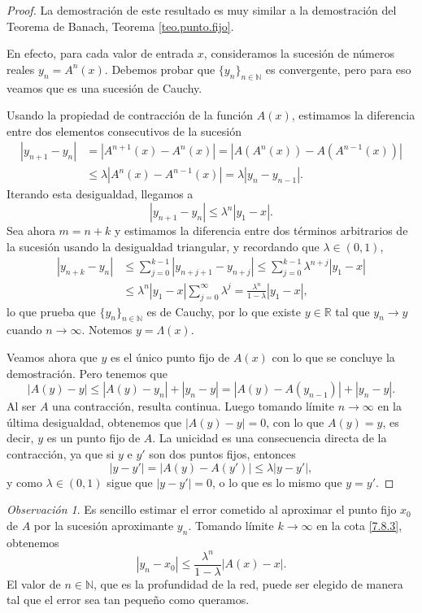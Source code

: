 \documentclass[12pt, a4paper]{amsbook}
\newcommand{\R}{{\mathbb R}}
\newcommand{\N}{{\mathbb N}}
\theoremstyle{remark}
\newtheorem{obs}[teo]{Observaci\'on}
\theoremstyle{definition}
\numberwithin{section}{chapter}
\numberwithin{subsection}{section}
\numberwithin{equation}{section}
\numberwithin{figure}{chapter}
\begin{document}
\begin{proof}
La demostración de este resultado es muy similar a la demostración del Teorema de Banach, Teorema \ref{teo.punto.fijo}.

En efecto, para cada valor de entrada $x$, consideramos la sucesión de números reales $y_n=A^n(x)$. Debemos probar que $\{y_n\}_{n\in\N}$ es convergente, pero para eso veamos que es una sucesión de Cauchy.

Usando la propiedad de contracción de la función $A(x)$, estimamos la diferencia entre dos elementos consecutivos de la sucesión
\begin{align*}
|y_{n+1}-y_n| &= |A^{n+1}(x) - A^{n}(x)| = |A(A^n(x)) - A(A^{n-1}(x))|\\
&\le \lambda |A^n(x)-A^{n-1}(x)| = \lambda |y_n-y_{n-1}|.
\end{align*}
Iterando esta desigualdad, llegamos a
$$
|y_{n+1}-y_n|\le \lambda^n |y_1-x|.
$$
Sea ahora $m=n+k$ y estimamos la diferencia entre dos términos arbitrarios de la sucesión usando la desigualdad triangular, y recordando que $\lambda\in (0,1)$,
\begin{equation}\label{7.8.3}
\begin{split}
|y_{n+k}-y_n| &\le \sum_{j=0}^{k-1} |y_{n+j+1}-y_{n+j}|  \le \sum_{j=0}^{k-1} \lambda^{n+j}|y_1-x|\\
&\le \lambda^n |y_1-x|\sum_{j=0}^\infty \lambda^j = \frac{\lambda^n}{1-\lambda} |y_1-x|,
\end{split}
\end{equation}
lo que prueba que $\{y_n\}_{n\in\N}$ es de Cauchy, por lo que existe $y\in\R$ tal que $y_n\to y$ cuando $n\to \infty$. Notemos $y=\Lambda(x)$. 

Veamos ahora que $y$ es el único punto fijo de $A(x)$ con lo que se concluye la demostración. Pero tenemos que
$$
|A(y)-y|\le |A(y)-y_n| + |y_n-y| = |A(y)-A(y_{n-1})| + |y_n-y|.
$$
Al ser $A$ una contracción, resulta continua. Luego tomando límite $n\to\infty$ en la última desigualdad, obtenemos que $|A(y)-y|=0$, con lo que $A(y)=y$, es decir, $y$ es un punto fijo de $A$. La unicidad es una consecuencia directa de la contracción, ya que si $y$ e $y'$ son dos puntos fijos, entonces
$$
|y-y'| = |A(y)-A(y')|\le \lambda |y-y'|,
$$
y como $\lambda\in (0,1)$ sigue que $|y-y'|=0$, o lo que es lo mismo que $y=y'$.
\end{proof}

\begin{obs}
Es sencillo estimar el error cometido al aproximar el punto fijo $x_0$ de $A$ por la sucesión aproximante $y_n$. Tomando límite $k\to\infty$ en la cota \eqref{7.8.3}, obtenemos
$$
|y_n-x_0|\le \frac{\lambda^n}{1-\lambda} |A(x)-x|.
$$
El valor de $n\in\N$, que es la profundidad de la red, puede ser elegido de manera tal que el error sea tan pequeño como queramos.
\end{obs}
\end{document}
